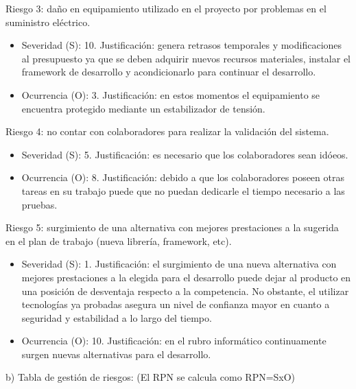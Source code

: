 \documentclass[
11pt, %
]{charter}
\begin{document}
Riesgo 3: daño en equipamiento utilizado en el proyecto por problemas en el suministro eléctrico.
\begin{itemize}
	\item Severidad (S): 10.\newline 
	Justificación: genera retrasos temporales y modificaciones al presupuesto ya que se deben adquirir nuevos recursos materiales, instalar el framework de desarrollo y acondicionarlo para continuar el desarrollo.
	\item Ocurrencia (O): 3.\newline 
	Justificación: en estos momentos el equipamiento se encuentra protegido mediante un estabilizador de tensión.
\end{itemize}	
Riesgo 4: no contar con colaboradores para realizar la validación del sistema.
\begin{itemize}
	\item Severidad (S): 5.\newline 
	Justificación: es necesario que los colaboradores sean idóeos.
	\item Ocurrencia (O): 8.\newline 
	Justificación: debido a que los colaboradores poseen otras tareas en su trabajo puede que no puedan dedicarle el tiempo necesario a las pruebas.
\end{itemize}
Riesgo 5: surgimiento de una alternativa con mejores prestaciones a la sugerida en el plan de trabajo (nueva librería, framework, etc).
\begin{itemize}
	\item Severidad (S): 1.\newline 
	Justificación: el surgimiento de una nueva alternativa con mejores prestaciones a la elegida para el desarrollo puede dejar al producto en una posición de desventaja respecto a la competencia. No obstante, el utilizar tecnologías ya probadas asegura un nivel de confianza mayor en cuanto a seguridad y estabilidad a lo largo del tiempo.
	\item Ocurrencia (O): 10.\newline 
	Justificación: en el rubro informático continuamente surgen nuevas alternativas para el desarrollo. 	
		 
	
\end{itemize}


b) Tabla de gestión de riesgos:      (El RPN se calcula como RPN=SxO)
\end{document}
